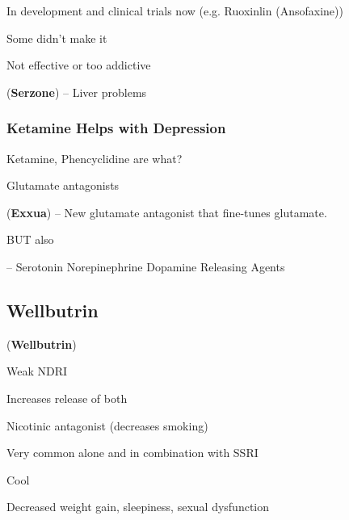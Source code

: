 \begin{coloredlist}
\begin{coloredlist}
        \item In development and clinical trials now (e.g. Ruoxinlin (Ansofaxine))
        \begin{coloredlist}
            \item Some didn't make it
            \begin{coloredlist}
                \item Not effective or too addictive
                \item {} (\textbf{Serzone}) -- Liver problems
            \end{coloredlist}
        \end{coloredlist}
    \end{coloredlist}
\end{coloredlist}

\subsubsection{Ketamine Helps with Depression}

\begin{coloredlist}
    \item Ketamine, Phencyclidine are what?
    \begin{coloredlist}
        \item Glutamate antagonists
        \item {} (\textbf{Exxua}) -- New glutamate antagonist that fine-tunes glutamate.
    \end{coloredlist}
    \item BUT also
    \begin{coloredlist}
        \item {} -- Serotonin Norepinephrine Dopamine Releasing Agents
    \end{coloredlist}
\end{coloredlist}

\subsection{Wellbutrin}

\begin{coloredlist}
    \item {} (\textbf{Wellbutrin}) 
    \begin{coloredlist}
        \item Weak NDRI
        \item Increases release of both
        \item Nicotinic antagonist (decreases smoking)
        \item Very common alone and in combination with SSRI
        \item Cool
        \begin{coloredlist}
            \item Decreased weight gain, sleepiness, sexual dysfunction
        \end{coloredlist}
    \end{coloredlist}
\end{coloredlist}